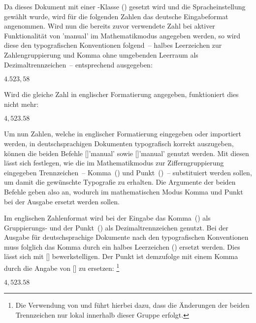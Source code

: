 \documentclass[english,ngerman]{tudscrartcl}
\begin{document}
\begin{Entity}{}
Da dieses Dokument mit einer \TUDScript-Klasse (\TUDClassName) gesetzt wird und 
die Spracheinstellung~ gewählt wurde, wird für die folgenden 
Zahlen das deutsche Eingabeformat angenommen. Wird nun die bereits zuvor 
verwendete Zahl bei aktiver Funktionalität von 'manual' im 
Mathematikmodus angegeben werden, so wird diese den typografischen Konventionen 
folgend~-- halbes Leerzeichen zur Zahlengruppierung und Komma ohne umgebenden 
Leerraum als Dezimaltrennzeichen~-- entsprechend ausgegeben:
%
\begin{Trunk*}
\(4.523,58\)
\end{Trunk*}
%
Wird die gleiche Zahl in englischer Formatierung angegeben, funktioniert dies 
nicht mehr:
%
\begin{Trunk*}
\(4,523.58\)

\end{Trunk*}
%
Um nun Zahlen, welche in englischer Formatierung eingegeben oder importiert 
werden, in deutschsprachigen Dokumenten typografisch korrekt auszugeben, können
die beiden Befehle [\MPValue{\dots}]'manual' sowie 
[\MPValue{\dots}]'manual' genutzt werden. Mit diesen lässt 
sich festlegen, wie die im Mathematikmodus zur Zifferngruppierung eingegeben 
Trennzeichen~-- Komma~(\PValue{,}) und Punkt~()~-- substituiert 
werden sollen, um damit die gewünschte Typografie zu erhalten. Die Argumente 
der beiden Befehle geben also an, wodurch im mathematischen Modus Komma und 
Punkt bei der Ausgabe ersetzt werden sollen.

Im englischen Zahlenformat wird bei der Eingabe das Komma~(\PValue{,}) als 
Gruppierungs- und der Punkt~() als Dezimaltrennzeichen genutzt. Bei 
der Ausgabe für deutschsprachige Dokumente nach den typografischen Konventionen 
muss folglich das Komma durch ein halbes Leerzeichen (\Macro*{,}) ersetzt 
werden. Dies lässt sich mit [\MPValue{\Macro*{,}}] 
bewerkstelligen. Der Punkt ist demzufolge mit einem Komma durch die Angabe von
[\MPValue{,}] zu ersetzen:%
\footnote{%
  Die Verwendung von  und  führt hierbei 
  dazu, dass die Änderungen der beiden Trennzeichen nur lokal innerhalb dieser 
  Gruppe erfolgt.
}
%
\begin{Trunk*}
\begingroup
  \commaswap{\,}
  \dotswap{,}
  \(4,523.58\)
\endgroup


\end{Trunk*}
\end{Entity}
\end{document}
